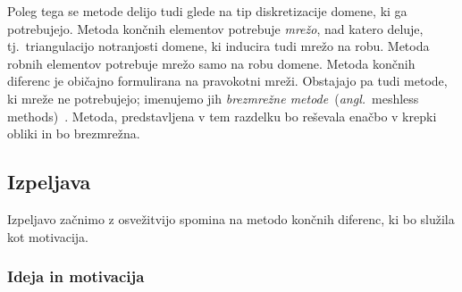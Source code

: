 \documentclass[12pt,a4paper,twoside]{article}
\theoremstyle{definition} %
\theoremstyle{plain} %
\numberwithin{equation}{section}
\newcommand{\ang}[1]{(\hspace{-1.5px}\textit{angl.}\ #1)}
\begin{document}
Poleg tega se metode delijo tudi glede na tip diskretizacije domene, ki ga potrebujejo. Metoda
končnih elementov potrebuje \emph{mrežo}, nad katero deluje, tj.\ triangulacijo notranjosti domene,
ki inducira tudi mrežo na robu. Metoda robnih elementov potrebuje mrežo samo na robu domene. Metoda
končnih diferenc je običajno formulirana na pravokotni mreži. Obstajajo pa tudi metode, ki mreže ne
potrebujejo; imenujemo jih \emph{brezmrežne metode}~\ang{meshless methods}~\cite{meshless_review}.
Metoda, predstavljena v tem razdelku bo reševala enačbo v krepki obliki in bo brezmrežna.

\subsection{Izpeljava}

Izpeljavo začnimo z osvežitvijo spomina na metodo končnih diferenc, ki bo
služila kot motivacija.

\subsubsection{Ideja in motivacija}
\end{document}
